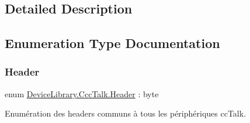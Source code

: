 \subsection{Detailed Description}


\subsection{Enumeration Type Documentation}
\mbox{\label{group___header_ga22f8eb6526627d4203e53ce7dbd3052a}} 
\subsubsection{\texorpdfstring{Header}{Header}\hspace{0.1cm}{\footnotesize\ttfamily [1/3]}}
{\footnotesize\ttfamily enum \mbox{\hyperlink{group___header_ga22f8eb6526627d4203e53ce7dbd3052a}{Device\+Library.\+Ccc\+Talk.\+Header}} \+: byte\hspace{0.3cm}{\ttfamily [strong]}}



Enumération des headers communs à tous les périphériques cc\+Talk. 

